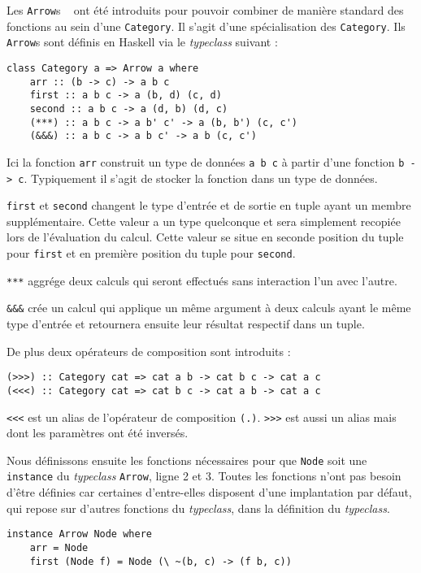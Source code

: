 \documentclass{llncs}
\newcommand{\Arrs}{\lstinline{Arrow}s }
\newcommand{\Arrv}{\lstinline{Arrow}, }
\begin{document}
Les \Arrs~\cite{Hughes00} ont été introduits pour pouvoir combiner de manière
standard des fonctions au sein d'une \lstinline{Category}.
Il s'agit d'une spécialisation des \lstinline{Category}.
Ils \Arrs sont définis en Haskell via le \emph{typeclass} suivant :
\begin{lstlisting}
class Category a => Arrow a where
    arr :: (b -> c) -> a b c
    first :: a b c -> a (b, d) (c, d)
    second :: a b c -> a (d, b) (d, c)
    (***) :: a b c -> a b' c' -> a (b, b') (c, c')
    (&&&) :: a b c -> a b c' -> a b (c, c')
\end{lstlisting}

Ici la fonction \lstinline{arr} construit un type de données
\lstinline{a b c} à partir d'une fonction \lstinline{b -> c}.
Typiquement il s'agit de stocker la fonction dans un type de données.

\lstinline{first} et \lstinline{second} changent le type d'entrée et de sortie
en tuple ayant un membre supplémentaire.
Cette valeur a un type quelconque et sera simplement recopiée lors de l'évaluation
du calcul.
Cette valeur se situe en seconde position du tuple pour \lstinline{first} et en
première position du tuple pour \lstinline{second}.

\lstinline{***} aggrége deux calculs qui seront effectués sans interaction l'un
avec l'autre.

\lstinline{&&&} crée un calcul qui applique un même argument à deux calculs ayant
le même type d'entrée et retournera ensuite leur résultat respectif dans un tuple.

De plus deux opérateurs de composition sont introduits :
\begin{lstlisting}
(>>>) :: Category cat => cat a b -> cat b c -> cat a c
(<<<) :: Category cat => cat b c -> cat a b -> cat a c
\end{lstlisting}

\lstinline{<<<} est un alias de l'opérateur de composition \lstinline{(.)}.
\lstinline{>>>} est aussi un alias mais dont les paramètres ont été inversés.

Nous définissons ensuite les fonctions nécessaires pour que \lstinline{Node} soit
une \lstinline{instance} du \emph{typeclass} \Arrv ligne 2 et 3.
Toutes les fonctions n'ont pas besoin d'être définies car certaines d'entre-elles
disposent d'une implantation par défaut, qui repose sur d'autres fonctions du
\emph{typeclass}, dans la définition du \emph{typeclass}.

\begin{lstlisting}
instance Arrow Node where
    arr = Node
    first (Node f) = Node (\ ~(b, c) -> (f b, c))
\end{lstlisting}
\end{document}
